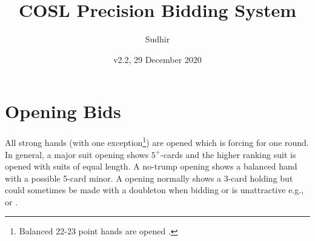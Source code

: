 \documentclass[a4paper,article,oneside]{memoir}
\newcommand{\vone}[1]{{\color{v1color}#1}}
\begin{document}
\title{COSL Precision Bidding System}
\author{Sudhir}
\date{v2.2, 29 December 2020}
\maketitle

\tableofcontents

\pagebreak

\section{Opening Bids}

All strong hands (\vone{with one exception}\footnote{Balanced 22-23
  point hands are opened .}) are opened  which is forcing
for one round. In general, a major suit opening shows $5^+$-cards and
the higher ranking suit is opened with suits of equal length. A
no-trump opening shows a balanced hand with a possible 5-card minor. A
 opening normally shows a 3-card holding but could sometimes be
made with a doubleton when bidding  or  is unattractive
e.g.,  or .
\end{document}
